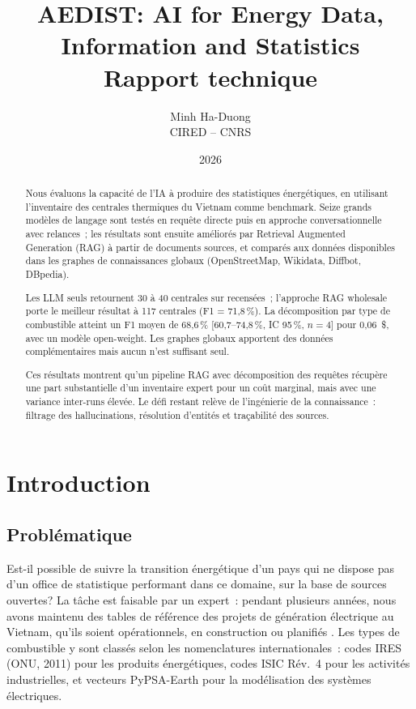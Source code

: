 \documentclass[a4paper,11pt]{report}
\title{AEDIST: AI for Energy Data, Information and Statistics\\
\large Rapport technique}
\author{Minh Ha-Duong\\CIRED -- CNRS}
\date{2026}
\begin{document}
\maketitle
\setcounter{tocdepth}{2}
\tableofcontents

\begin{abstract}
Nous évaluons la capacité de l'IA à produire des statistiques énergétiques, en utilisant l'inventaire des centrales thermiques du Vietnam comme benchmark. Seize grands modèles de langage sont testés en requête directe puis en approche conversationnelle avec relances~; les résultats sont ensuite améliorés par Retrieval Augmented Generation (RAG) à partir de documents sources, et comparés aux données disponibles dans les graphes de connaissances globaux (OpenStreetMap, Wikidata, Diffbot, DBpedia).

Les LLM seuls retournent 30 à 40 centrales sur \NumRefPlants{} recensées~; l'approche RAG wholesale porte le meilleur résultat à 117 centrales (F1 = 71,8\,\%). La décomposition par type de combustible atteint un F1 moyen de 68,6\,\% [60,7--74,8\,\%, IC 95\,\%, $n=4$] pour 0,06~\$, avec un modèle open-weight. Les graphes globaux apportent des données complémentaires mais aucun n'est suffisant seul.

Ces résultats montrent qu'un pipeline RAG avec décomposition des requêtes récupère une part substantielle d'un inventaire expert pour un coût marginal, mais avec une variance inter-runs élevée. Le défi restant relève de l'ingénierie de la connaissance~: filtrage des hallucinations, résolution d'entités et traçabilité des sources.
\end{abstract}

\chapter{Introduction}

\section{Problématique}

Est-il possible de suivre la transition énergétique d'un pays qui ne dispose pas d'un office de statistique performant dans ce domaine, sur la base de sources ouvertes? La tâche est faisable par un expert~: pendant plusieurs années, nous avons maintenu des tables de référence des projets de génération électrique au Vietnam, qu'ils soient opérationnels, en construction ou planifiés \citep{NLN8GPNI}. Les types de combustible y sont classés selon les nomenclatures internationales~: codes IRES (ONU, 2011) pour les produits énergétiques, codes ISIC Rév.~4 pour les activités industrielles, et vecteurs PyPSA-Earth pour la modélisation des systèmes électriques.
\end{document}

